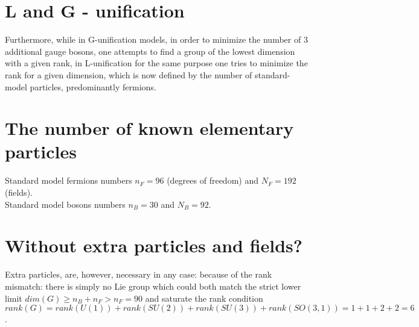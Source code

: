 \documentclass{article}
\begin{document}
\newpage
\section{L and G - unification}
Furthermore, while in G-unification models, in order to minimize the number of 3 additional gauge bosons, one attempts to find a group of the lowest dimension with a given rank, in L-unification for the same purpose one tries to minimize the rank for a given dimension, which is now defined by the number of standard-model particles, predominantly fermions. \\

\section{The number of known elementary particles}
Standard model fermions numbers $n_F = 96$ (degrees of freedom) and $N_F = 192$ (fields). \\
Standard model bosons numbers $n_B = 30$ and $N_B = 92$. \\

\section{Without extra particles and fields?}
Extra particles, are, however, necessary in any case: because of the rank mismatch: there is simply no Lie group which could both match the strict lower limit $ dim(G) \geq n_B + n_F > n_F = 90$ and saturate the rank condition $rank(G) = rank(U (1)) + rank(SU (2)) + rank(SU (3)) + rank(SO(3, 1)) = 1 + 1 + 2 + 2 = 6$.
\end{document}
